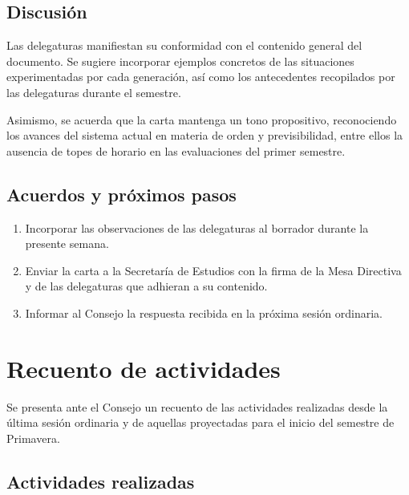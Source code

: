 \documentclass[12pt,letterpaper]{article}
\begin{document}
\subsection{Discusión}

Las delegaturas manifiestan su conformidad con el contenido general del documento. Se sugiere incorporar ejemplos concretos de las situaciones experimentadas por cada generación, así como los antecedentes recopilados por las delegaturas durante el semestre.

Asimismo, se acuerda que la carta mantenga un tono propositivo, reconociendo los avances del sistema actual en materia de orden y previsibilidad, entre ellos la ausencia de topes de horario en las evaluaciones del primer semestre.

\subsection{Acuerdos y próximos pasos}

\begin{enumerate}
  \item Incorporar las observaciones de las delegaturas al borrador durante la presente semana.
  \item Enviar la carta a la Secretaría de Estudios con la firma de la Mesa Directiva y de las delegaturas que adhieran a su contenido.
  \item Informar al Consejo la respuesta recibida en la próxima sesión ordinaria.
\end{enumerate}

\section{Recuento de actividades}

Se presenta ante el Consejo un recuento de las actividades realizadas desde la última sesión ordinaria y de aquellas proyectadas para el inicio del semestre de Primavera.

\subsection{Actividades realizadas}
\end{document}

